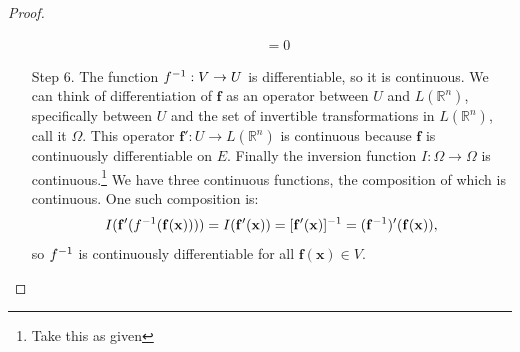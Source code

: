 \documentclass{article}
\newcommand{\R}{\mathbb{R}}
\newcommand{\x}{\mathbf{x}}
\newcommand{\f}{\mathbf{f}}
\theoremstyle{definition}
\begin{document}
\begin{proof}
\begin{enumerate}
{\begin{align*}
	& = 0 
\end{align*}}
\item [Step 6.] The function $ \mathbf \f^{-1}:V\to U $ is differentiable, so it is continuous. We can think of differentiation of $ \f $ as an operator between $ U $ and $ L(\R^n) $, specifically between $ U $ and the set of invertible transformations in $ L(\R^n) $, call it $ \Omega $. This operator $ \f':U\to L(\R^n) $ is continuous because $ \f $ is continuously differentiable on $ E $. Finally the inversion function $ I:\Omega \to \Omega $ is continuous.\footnote{Take this as given} We have three continuous functions, the composition of which is continuous. One such composition is: 
$$I(\f'(\mathbf \f^{-1}(\f(\x)))) =I(\f'(\x)) =[\f'(\x)]^{-1}= (\f^{-1})'(\f(\x)) ,$$ so $ \mathbf \f^{-1} $ is continuously differentiable for all $ \f(\x)\in V $.
\end{enumerate}
\end{proof}
\end{document}
